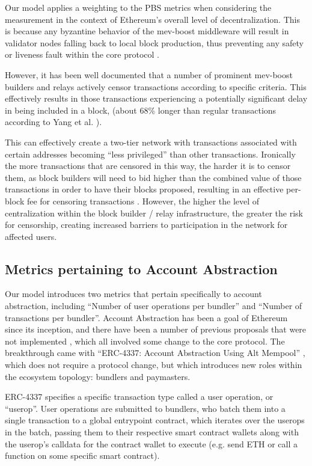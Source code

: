 \documentclass[conference]{IEEEtran}
\begin{document}
Our model applies a weighting to the PBS metrics when considering the measurement in the context of Ethereum's overall level of decentralization.  This is because any byzantine behavior of the mev-boost middleware will result in validator nodes falling back to local block production, thus preventing any safety or liveness fault within the core protocol \cite{hasu2022}.

However, it has been well documented \cite{labrys2022} that a number of prominent mev-boost builders and relays actively censor transactions according to specific criteria.  This effectively results in those transactions experiencing a potentially significant delay in being included in a block, (about 68\% longer than regular transactions according to Yang et al. \cite{yang2022sok}). 

This can effectively create a two-tier network with transactions associated with certain addresses becoming ``less privileged'' than other transactions.  Ironically the more transactions that are censored in this way, the harder it is to censor them, as block builders will need to bid higher than the combined value of those transactions in order to have their blocks proposed, resulting in an effective per-block fee for censoring transactions \cite{buterin2022}.  However, the higher the level of centralization within the block builder / relay infrastructure, the greater the risk for censorship, creating increased barriers to participation in the network for affected users.

\subsection{Metrics pertaining to Account Abstraction}

Our model introduces two metrics that pertain specifically to account abstraction, including ``Number of user operations per bundler'' and ``Number of transactions per bundler''. Account Abstraction has been a goal of Ethereum since its inception, and there have been a number of previous proposals that were not implemented \cite{john2023, wilson2020, dietrichs2020}, which all involved some change to the core protocol.  The breakthrough came with ``ERC-4337: Account Abstraction Using Alt Mempool'' \cite{buterin2021B}, which does not require a protocol change, but which introduces new roles within the ecosystem topology: bundlers and paymasters.

ERC-4337 specifies a specific transaction type called a user operation, or ``userop''.  User operations are submitted to bundlers, who batch them into a single transaction to a global entrypoint contract, which iterates over the userops in the batch, passing them to their respective smart contract wallets along with the userop's calldata for the contract wallet to execute (e.g. send ETH or call a function on some specific smart contract).
\end{document}
